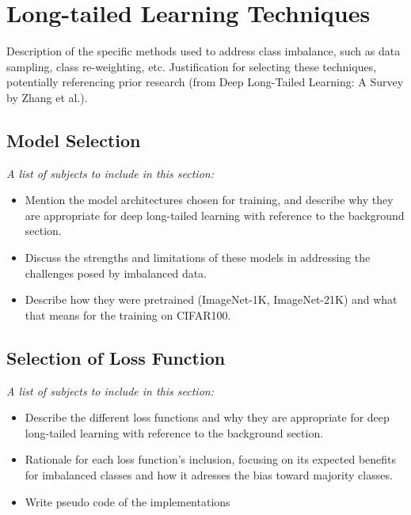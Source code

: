 \section{Long-tailed Learning Techniques}
Description of the specific methods used to address class imbalance, such as data sampling, class re-weighting, etc. 
Justification for selecting these techniques, potentially referencing prior research (from Deep Long-Tailed Learning: A Survey by Zhang et al.).

\subsection{Model Selection}
\label{sec:model_selection}
\textit{A list of subjects to include in this section:}

\begin{itemize}
    \item Mention the model architectures chosen for training, and describe why they are appropriate for deep long-tailed learning with reference to the background section.
    \item Discuss the strengths and limitations of these models in addressing the challenges posed by imbalanced data.
    \item Describe how they were pretrained (ImageNet-1K, ImageNet-21K) and what that means for the training on CIFAR100.
\end{itemize}


\subsection{Selection of Loss Function}
\textit{A list of subjects to include in this section:}

 \begin{itemize}
    \item Describe the different loss functions and why they are appropriate for deep long-tailed learning with reference to the background section.
    \item Rationale for each loss function's inclusion, focusing on its expected benefits for imbalanced classes and how it adresses the bias toward majority classes.
    \item Write pseudo code of the implementations
 \end{itemize}


